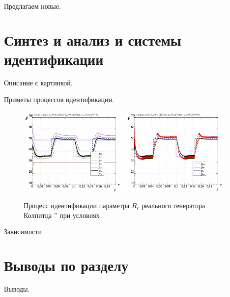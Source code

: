 Предлагаем новые.

\section{Синтез и анализ и системы идентификации}

Описание с картинкой.

Приметы процессов идентификации.

\begin{figure}[htb!]
  \centerline{
    \includegraphics[width=0.48\textwidth]{p/colp_real_id_qi_fv5-p_p_01.png}
    \hfill
    \includegraphics[width=0.48\textwidth]{p/colp_real_id_qi_fv5-p_pp_01.png}
  }
  \caption{Процесс идентификации параметра $R_c$ реального генератора Колпитца '' при условиях }
  \label{atu:f:colp_r_id_1}
\end{figure}

Зависимости

\section{Выводы по разделу \thechapter}

Выводы.

